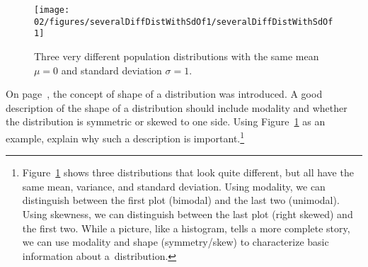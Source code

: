 
\begin{figure}
\centering
\texttt{[image: 02/figures/severalDiffDistWithSdOf1/severalDiffDistWithSdOf1]}
\caption{Three very different population distributions with the same mean $\mu=0$ and standard deviation $\sigma=1$.}
\label{severalDiffDistWithSdOf1}
\end{figure}

\begin{exercise}
On page~\pageref{shapeFirstDiscussed}, the concept of shape of a distribution was introduced. A good description of the shape of a distribution should include modality and whether the distribution is symmetric or skewed to one side. Using Figure~\ref{severalDiffDistWithSdOf1} as an example, explain why such a description is important.\footnote{Figure~\ref{severalDiffDistWithSdOf1} shows three distributions that look quite different, but all have the same mean, variance, and standard deviation. Using modality, we can distinguish between the first plot (bimodal) and the last two (unimodal). Using skewness, we can distinguish between the last plot (right skewed) and the first two. While a picture, like a histogram, tells a more complete story, we can use modality and shape (symmetry/skew) to characterize basic information about a~distribution.}
\end{exercise}


